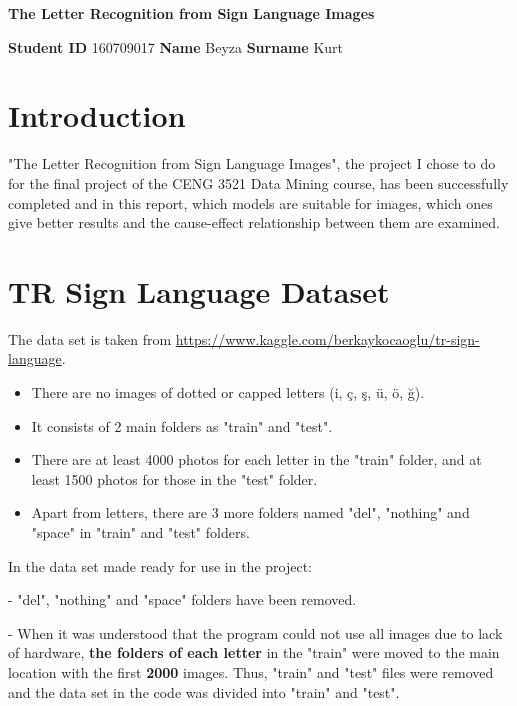\documentclass{article}
\begin{document}
\begin{center}
    \Large
    \textbf{The Letter Recognition from Sign Language Images}
\end{center}

\begin{flushleft}
\textbf{Student ID} 160709017
\newline\textbf{Name} Beyza
\newline\textbf{Surname} Kurt
\end{flushleft}

\begin{flushleft}

\section{Introduction}
"The Letter Recognition from Sign Language Images", the project I chose to do for the final project of the CENG 3521 Data Mining course, has been successfully completed and in this report, which models are suitable for images, which ones give better results and the cause-effect relationship between them are examined.

\section{TR Sign Language Dataset}
The data set is taken from \hyperlink{https://www.kaggle.com/berkaykocaoglu/tr-sign-language}{https://www.kaggle.com/berkaykocaoglu/tr-sign-language}.

\begin{itemize}
    \item There are no images of dotted or capped letters (i, ç, ş, ü, ö, ğ).
    \item It consists of 2 main folders as "train" and "test".
    \item There are at least 4000 photos for each letter in the "train" folder, and at least 1500 photos for those in the "test" folder.
    \item Apart from letters, there are 3 more folders named "del", "nothing" and "space" in "train" and "test" folders.
\end{itemize}

In the data set made ready for use in the project:

- "del", "nothing" and "space" folders have been removed.

- When it was understood that the program could not use all images due to lack of hardware, \textbf{the folders of each letter} in the "train" were moved to the main location with the first \textbf{2000} images. Thus, "train" and "test" files were removed and the data set in the code was divided into "train" and "test".


\end{flushleft}
\end{document}
